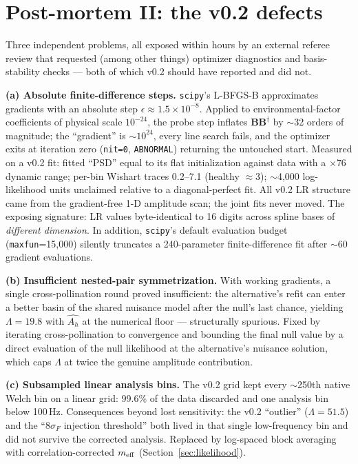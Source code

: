 \documentclass[11pt]{article}
\newcommand{\Ah}{A_h}
\begin{document}
\section{Post-mortem II: the v0.2 defects}
\label{app:postmortem2}

Three independent problems, all exposed within hours by an external referee review that requested (among other things) optimizer diagnostics and basis-stability checks --- both of which v0.2 should have reported and did not.

\textbf{(a) Absolute finite-difference steps.} \texttt{scipy}'s L-BFGS-B approximates gradients with an absolute step $\epsilon \approx 1.5\times10^{-8}$. Applied to environmental-factor coefficients of physical scale $10^{-24}$, the probe step inflates $\mathbf{B}\mathbf{B}^\dagger$ by $\sim$32 orders of magnitude; the ``gradient'' is $\sim$$10^{24}$, every line search fails, and the optimizer exits at iteration zero (\texttt{nit=0}, \texttt{ABNORMAL}) returning the untouched start. Measured on a v0.2 fit: fitted ``PSD'' equal to its flat initialization against data with a $\times$76 dynamic range; per-bin Wishart traces 0.2--7.1 (healthy $\approx 3$); $\sim$4{,}000 log-likelihood units unclaimed relative to a diagonal-perfect fit. All v0.2 LR structure came from the gradient-free 1-D amplitude scan; the joint fits never moved. The exposing signature: LR values byte-identical to 16 digits across spline bases of \emph{different dimension}. In addition, \texttt{scipy}'s default evaluation budget (\texttt{maxfun}=15{,}000) silently truncates a 240-parameter finite-difference fit after $\sim$60 gradient evaluations.

\textbf{(b) Insufficient nested-pair symmetrization.} With working gradients, a single cross-pollination round proved insufficient: the alternative's refit can enter a better basin of the shared nuisance model after the null's last chance, yielding $\Lambda = 19.8$ with $\hat{\Ah}$ at the numerical floor --- structurally spurious. Fixed by iterating cross-pollination to convergence and bounding the final null value by a direct evaluation of the null likelihood at the alternative's nuisance solution, which caps $\Lambda$ at twice the genuine amplitude contribution.

\textbf{(c) Subsampled linear analysis bins.} The v0.2 grid kept every $\sim$250th native Welch bin on a linear grid: 99.6\% of the data discarded and one analysis bin below 100\,Hz. Consequences beyond lost sensitivity: the v0.2 ``outlier'' ($\Lambda = 51.5$) and the ``$8\sigma_F$ injection threshold'' both lived in that single low-frequency bin and did not survive the corrected analysis. Replaced by log-spaced block averaging with correlation-corrected $m_{\rm eff}$ (Section~\ref{sec:likelihood}).
\end{document}
